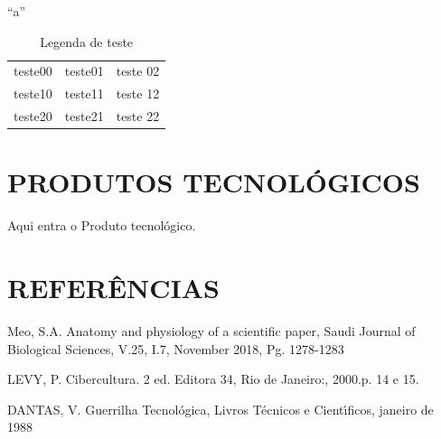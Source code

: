 \documentclass[
12pt,		%
openright,	%
twoside,  %
a4paper,			%
chapter=TITLE,		%
english,			%
french,				%
spanish,			%
brazil				%
]{USPSC-classe/USPSC}
\begin{document}
``a''






\begin{table}[htb]
\tiny
\caption{\label{e1fee5245f1f580d36a53669e2e1e0d16ec34593}Legenda de teste}

\centering
\begin{tabular}{|c|c|c|}
\hline
teste00  &  teste01  &  teste 02 \\
teste10  &  teste11  &  teste 12 \\
teste20  &  teste21  &  teste 22 \\
\hline
\end{tabular}
\end{table}


\chapter[PRODUTOS TECNOL\'OGICOS]{PRODUTOS TECNOL\'OGICOS}\label{PRODUTOS TECNOL\'OGICOS}
Aqui entra o Produto tecnol\'ogico.


\chapter[REFER\^ENCIAS]{REFER\^ENCIAS}\label{REFER\^ENCIAS}
\begin{flushleft}
\begin{flushleft}
[MEO, 2018] Meo, S.A. Anatomy and physiology of a scientific paper, Saudi Journal of Biological Sciences, V.25, I.7, November 2018, Pg. 1278-1283
\end{flushleft}


\end{flushleft}


\begin{flushleft}
\begin{flushleft}
[LEVY, 2000] LEVY, P. Cibercultura. 2 ed. Editora 34,  Rio de Janeiro:, 2000.p. 14 e 15.
\end{flushleft}


\end{flushleft}


\begin{flushleft}
\begin{flushleft}
[DANTAS, 1988] DANTAS, V. Guerrilha Tecnol\'ogica, Livros T\'ecnicos e Cient\'{\i}ficos, janeiro de 1988
\end{flushleft}


\end{flushleft}
\end{document}

